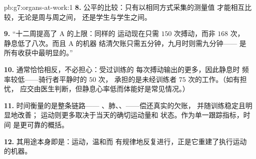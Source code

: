 \begin{solution}{pb:g7:organs-at-work:1}
\textbf{8.} 公平的比较：只有以相同方式采集的测量值
才能相互比较，无论是周与周之间，
还是学生与学生之间。

\textbf{9.} “十二周提高了 A 的上限：同样的
运动现在只需 $150$ 次搏动，而非 $168$ 次，
静息低了八次。而且 A 的机器
结清欠账只需五分钟，九月时则需九分钟——
是所有收获中最明显的。”

\textbf{10.} 通常恰恰相反，不必担心：受过训练的
每次搏动输出的更多，因此静息时
频率较低——骑行者平静时的 $50$ 次，
承担的是未经训练者 $75$ 次的工作。（如有担忧，
应交由医生判断，但静息心率低而体能好是常见情况。）

\textbf{11.} 时间衡量的是整条链路——
、肺、、——偿还真实的欠账，
并随训练稳定且明显地改善；
运动则更多取决于当天的确切运动量和
状态。作为单一跟踪指标，时间
是更可靠的概括。

\textbf{12.} 其用途本身即是：运动，温和而
有规律地反复进行，正是它重建了执行运动的机器。
\end{solution}
